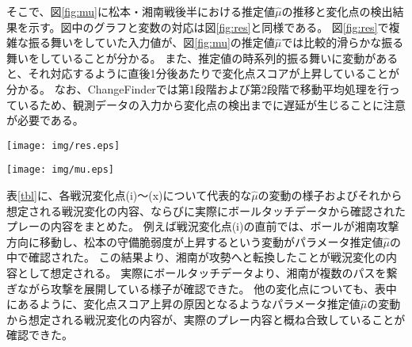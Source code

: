そこで、図\ref{fig:mu}に松本・湘南戦後半における推定値$\hat{\mu}$の推移と変化点の検出結果を示す。図中のグラフと変数の対応は図\ref{fig:res}と同様である。
図\ref{fig:res}で複雑な振る舞いをしていた入力値が、図\ref{fig:mu}の推定値$\hat{\mu}$では比較的滑らかな振る舞いをしていることが分かる。
また、推定値の時系列的振る舞いに変動があると、それ対応するように直後1分後あたりで変化点スコアが上昇していることが分かる。
なお、ChangeFinderでは第1段階および第2段階で移動平均処理を行っているため、観測データの入力から変化点の検出までに遅延が生じることに注意が必要である。

\begin{figure*}[htbp]
  \begin{center}
    \texttt{[image: img/res.eps]}
    \renewcommand{\baselinestretch}{1}%
    \caption{松本・湘南戦後半における入力データおよび変化点スコア出力結果．　上段1行目にボール位置（ball）と前線位置（frontLine）、2行目に湘南ベルマーレと松本山雅FCのコンパクトネス（compact）、3行目に湘南ベルマーレと松本山雅FCの守備脆弱度（defence）をそれぞれ灰色および黒色で、4行目に松本山雅FCの攻撃率（attack）を示す。AWAYおよびHOMEはそれぞれ湘南ベルマーレと松本山雅FCに対応する。下段はChangeFinderによる変化点スコアの出力値$Score(t)$である。}
    \label{fig:res}
  \end{center}
\end{figure*}

\begin{figure*}[htbp]
  \begin{center}
    \texttt{[image: img/mu.eps]}
    \renewcommand{\baselinestretch}{1}%
    \caption{松本・湘南戦後半におけるパラメータ$\mu$の推定値$\hat{\mu}$の推移および変化点スコア出力結果．　図中のグラフと変数の対応は図\ref{fig:res}に同じ。なお、試合開始60秒間のパラメータは推定されていない。}
  \label{fig:mu}
  \end{center}
\end{figure*}

表\ref{tbl}に、各戦況変化点(i)～(x)について代表的な$\hat{\mu}$の変動の様子およびそれから想定される戦況変化の内容、ならびに実際にボールタッチデータから確認されたプレーの内容をまとめた。
例えば戦況変化点(i)の直前では、ボールが湘南攻撃方向に移動し、松本の守備脆弱度が上昇するという変動がパラメータ推定値$\hat{\mu}$の中で確認された。
この結果より、湘南が攻勢へと転換したことが戦況変化の内容として想定される。
実際にボールタッチデータより、湘南が複数のパスを繋ぎながら攻撃を展開している様子が確認できた。
他の変化点についても、表中にあるように、変化点スコア上昇の原因となるようなパラメータ推定値$\hat{\mu}$の変動から想定される戦況変化の内容が、実際のプレー内容と概ね合致していることが確認できた。

